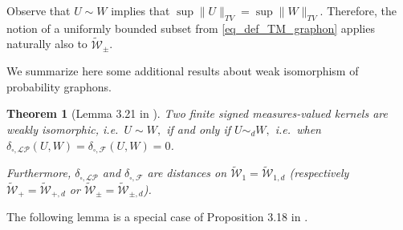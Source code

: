 \documentclass[11pt]{article}
\newtheorem{theorem}{Theorem}[section]
\newcommand{\cF}{{\mathcal F}}  %
\newcommand{\ie}{i.e.\ }
\newcommand{\signed}{\pm}
\newcommand{\UGraphon}{\widetilde{\mathcal{W}}_1}
\newcommand{\UGraphond}{\widetilde{\mathcal{W}}_{1,d}}
\newcommand{\UKernel}{\widetilde{\mathcal{W}}_{\signed}}
\newcommand{\UKerneld}{\widetilde{\mathcal{W}}_{\signed,d}}
\newcommand{\UKernelpd}{\widetilde{\mathcal{W}}_{+,d}}
\newcommand{\UKernelp}{\widetilde{\mathcal{W}}_{+}}
\newcommand{\simd}{\sim_{d}}
\begin{document}
Observe that $U\sim W$ implies that $\sup\|U\|_{TV}=\sup\|W\|_{TV}.$
Therefore, the notion of a uniformly bounded subset from \eqref{eq_def_TM_graphon} applies naturally also to $\UKernel$.

We summarize here some additional results about weak isomorphism of probability graphons.



\begin{theorem}[Lemma 3.21 in \cite{abraham2023probabilitygraphons}]
   \label{theo:Wm=W}
   Two finite signed measures-valued kernels are weakly isomorphic, \ie $U \sim W,$ if and only if $U \simd W,$ i.e.\ when $\delta_{\square,\mathcal{LP}}(U,W)=\delta_{\square,\cF}(U,W)= 0$.

   Furthermore, $\delta_{\square,\mathcal{LP}}$ and $\delta_{\square,\cF}$ are distances on $\UGraphon=\UGraphond$ (respectively $\UKernelp=\UKernelpd$ or $\UKernel=\UKerneld$).
\end{theorem}

The following lemma is a special case of Proposition 3.18 in \cite{abraham2023probabilitygraphons}.

\end{document}
